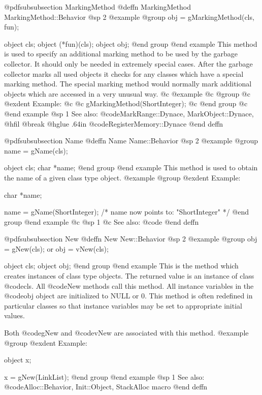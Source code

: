@pdfsubsubsection {MarkingMethod}
@deffn {MarkingMethod} MarkingMethod::Behavior
@sp 2
@example
@group
obj = gMarkingMethod(cls, fun);

object  cls;
object  (*fun)(cls);
object  obj;
@end group
@end example
This method is used to specify an additional marking method to be used
by the garbage collector.  It should only be needed in extremely special
cases.  After the garbage collector marks all used objects it checks
for any classes which have a special marking method.  The special
marking method would normally mark additional objects which are accessed
in a very unusual way.
@c @example
@c @group
@c @exdent Example:
@c 
@c gMarkingMethod(ShortInteger);
@c @end group
@c @end example
@sp 1
See also:  @code{MarkRange::Dynace, MarkObject::Dynace,}
@hfil @break @hglue .64in    @code{RegisterMemory::Dynace}
@end deffn








@pdfsubsubsection {Name}
@deffn {Name} Name::Behavior
@sp 2
@example
@group
name = gName(cls);

object  cls;
char    *name;
@end group
@end example
This method is used to obtain the name of a given class type object.
@example
@group
@exdent Example:

char    *name;

name = gName(ShortInteger);
/*  name now points to:   "ShortInteger"  */
@end group
@end example
@c @sp 1
@c See also:  @code{}
@end deffn







@pdfsubsubsection {New}
@deffn {New} New::Behavior
@sp 2
@example
@group
obj = gNew(cls);
     or
obj = vNew(cls);

object  cls;
object  obj;
@end group
@end example
This is the method which creates instances of class type objects.  The
returned value is an instance of class @code{cls}.  All @code{New}
methods call this method.  All instance variables in the @code{obj}
object are initialized to NULL or 0.  This method is often redefined in
particular classes so that instance variables may be set to appropriate
initial values.

Both @code{gNew} and @code{vNew} are associated with this method.
@example
@group
@exdent Example:

object  x;

x = gNew(LinkList);
@end group
@end example
@sp 1
See also:  @code{Alloc::Behavior, Init::Object, StackAlloc macro}
@end deffn













